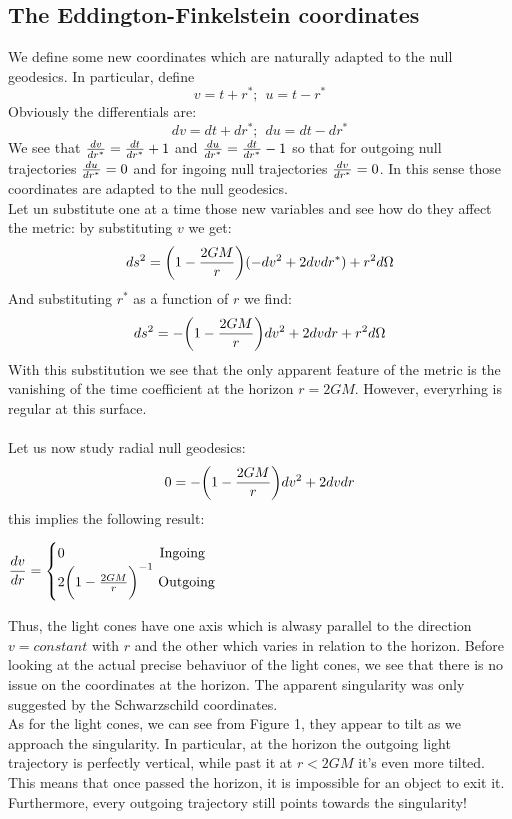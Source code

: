 \documentclass[]{article}
\theoremstyle{definition}
\theoremstyle{Theorem}
\theoremstyle{definition}
\theoremstyle{definition}
\theoremstyle{definition}
\begin{document}
\subsection{The Eddington-Finkelstein coordinates}
We define some new coordinates which are naturally adapted to the null geodesics. In particular, define
$$v=t+r^*;\hspace{5pt} u=t-r^*$$
Obviously the differentials are:
$$dv=dt+dr^*;\hspace{5pt} du=dt-dr^*$$
We see that ${dv\over dr^*}={dt\over dr^*}+1$ and ${du\over dr^*}={dt\over dr^*}-1$ so that for outgoing null trajectories ${du\over dr^*}=0$ and for ingoing null trajectories ${dv\over dr^*}=0$. In this sense those coordinates are adapted to the null geodesics.\\
Let un substitute one at a time those new variables and see how do they affect the metric: by substituting $v$ we get:
$$ds^2=\bigg(1-{2GM\over r}\bigg)(-dv^2+2dvdr^*)+r^2d\Omega$$
And substituting $r^*$ as a function of $r$ we find:
$$ds^2=-\bigg(1-{2GM\over r}\bigg)dv^2+2dvdr+r^2d\Omega$$
With this substitution we see that the only apparent feature of the metric is the vanishing of the time coefficient at the horizon $r=2GM$. However, everyrhing is regular at this surface.\\
\\
Let us now study radial null geodesics: 
$$0=-\bigg(1-{2GM\over r}\bigg)dv^2+2dvdr$$
this implies the following result:
\\
\begin{center}
	\begin{math}
		\displaystyle {dv\over dr}=
		\begin{cases}
			0 \mbox{\hspace{68pt}Ingoing}\\
			2\bigg(1-{2GM\over r}\bigg)^{-1} \mbox{  Outgoing}
		\end{cases}
	\end{math}
\end{center}
Thus, the light cones have one axis which is alwasy parallel to the direction $v=constant$ with $r$ and the other which varies in relation to the horizon. Before looking at the actual precise behaviuor of the light cones, we see that there is no issue on the coordinates at the horizon. The apparent singularity was only suggested by the Schwarzschild coordinates.\\
As for the light cones, we can see from Figure 1, they appear to tilt as we approach the singularity. In particular, at the horizon the outgoing light trajectory is perfectly vertical, while past it at $r<2GM$ it's even more tilted. This means that once passed the horizon, it is impossible for an object to exit it. Furthermore, every outgoing trajectory still points towards the singularity!\\
\end{document}
